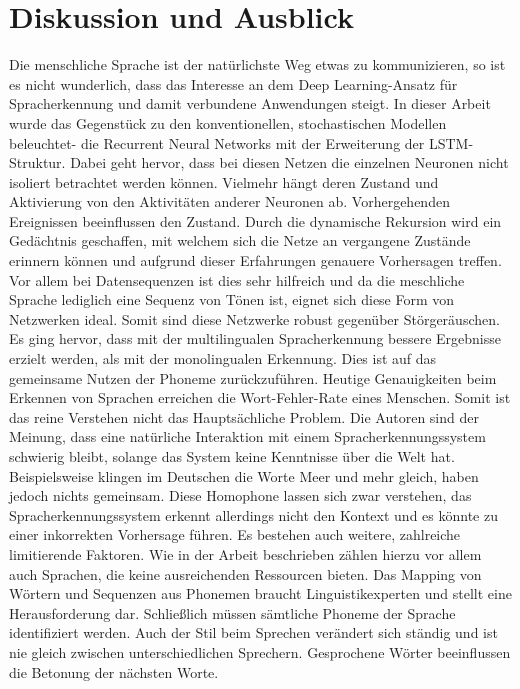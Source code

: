\section{Diskussion und Ausblick}
Die menschliche Sprache ist der natürlichste Weg etwas zu kommunizieren, so ist es nicht wunderlich, dass das Interesse an dem Deep Learning-Ansatz für Spracherkennung und damit verbundene Anwendungen steigt. In dieser Arbeit wurde das Gegenstück zu den konventionellen, stochastischen Modellen beleuchtet- die Recurrent Neural Networks mit der Erweiterung der LSTM-Struktur. Dabei geht hervor, dass bei diesen Netzen die einzelnen Neuronen nicht isoliert betrachtet werden können. Vielmehr hängt deren Zustand und Aktivierung von den Aktivitäten anderer Neuronen ab. Vorhergehenden Ereignissen beeinflussen den Zustand. Durch die dynamische Rekursion wird ein Gedächtnis geschaffen, mit welchem sich die Netze an vergangene Zustände erinnern können und aufgrund dieser Erfahrungen genauere Vorhersagen treffen. Vor allem bei Datensequenzen ist dies sehr hilfreich und da die meschliche Sprache lediglich eine Sequenz von Tönen ist, eignet sich diese Form von Netzwerken ideal. Somit sind diese Netzwerke robust gegenüber Störgeräuschen. Es ging hervor, dass mit der multilingualen Spracherkennung bessere Ergebnisse erzielt werden, als mit der monolingualen Erkennung. Dies ist auf das gemeinsame Nutzen der Phoneme zurückzuführen. Heutige Genauigkeiten beim Erkennen von Sprachen erreichen die Wort-Fehler-Rate eines Menschen. Somit ist das reine Verstehen nicht das Hauptsächliche Problem. Die Autoren sind der Meinung, dass eine natürliche Interaktion mit einem Spracherkennungssystem schwierig bleibt, solange das System keine Kenntnisse über die Welt hat. Beispielsweise klingen im Deutschen die Worte Meer und mehr gleich, haben jedoch nichts gemeinsam. Diese Homophone lassen sich zwar verstehen, das Spracherkennungssystem erkennt allerdings nicht den Kontext und es könnte zu einer inkorrekten Vorhersage führen. Es bestehen auch weitere, zahlreiche limitierende Faktoren. Wie in der Arbeit beschrieben zählen hierzu vor allem auch Sprachen, die keine ausreichenden Ressourcen bieten. Das Mapping von Wörtern und Sequenzen aus Phonemen braucht Linguistikexperten und stellt eine Herausforderung dar. Schließlich müssen sämtliche Phoneme der Sprache identifiziert werden. Auch der Stil beim Sprechen verändert sich ständig und ist nie gleich zwischen unterschiedlichen Sprechern. Gesprochene Wörter beeinflussen die Betonung der nächsten Worte.
